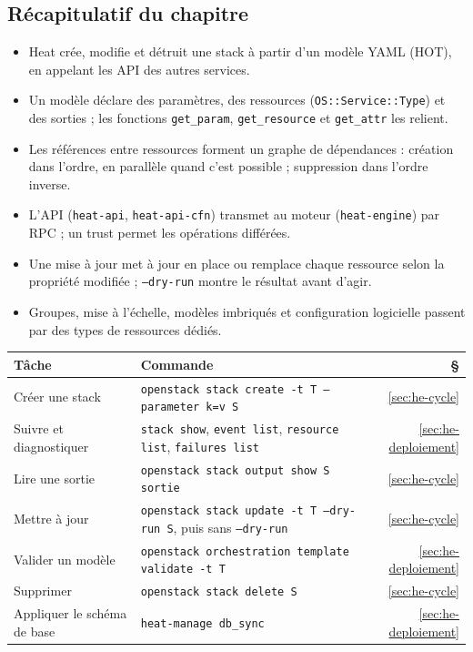\subsection{Récapitulatif du chapitre}\label{sec:he-recap}

\begin{aretenir}
\begin{itemize}
  \item Heat crée, modifie et détruit une \gls{stack} à partir d'un modèle YAML (HOT), en appelant les API des autres services.
  \item Un modèle déclare des paramètres, des ressources (\texttt{OS::Service::Type}) et des sorties ; les fonctions
        \texttt{get\_param}, \texttt{get\_resource} et \texttt{get\_attr} les relient.
  \item Les références entre ressources forment un graphe de dépendances : création dans l'ordre, en parallèle quand c'est
        possible ; suppression dans l'ordre inverse.
  \item L'API (\texttt{heat-api}, \texttt{heat-api-cfn}) transmet au moteur (\texttt{heat-engine}) par RPC ; un trust permet
        les opérations différées.
  \item Une mise à jour met à jour en place ou remplace chaque ressource selon la propriété modifiée ; \texttt{--dry-run}
        montre le résultat avant d'agir.
  \item Groupes, mise à l'échelle, modèles imbriqués et configuration logicielle passent par des types de ressources dédiés.
\end{itemize}
\end{aretenir}

\begin{center}
\renewcommand{\arraystretch}{1.35}
\begin{tabular}{@{}>{\raggedright\arraybackslash}p{4.2cm}>{\raggedright\arraybackslash}p{9.9cm}r@{}}
\toprule
\textbf{Tâche} & \textbf{Commande} & \textbf{§} \\
\midrule
Créer une stack & \texttt{openstack stack create -t T --parameter k=v S} & \ref{sec:he-cycle} \\
Suivre et diagnostiquer & \texttt{stack show}, \texttt{event list}, \texttt{resource list}, \texttt{failures list} & \ref{sec:he-deploiement} \\
Lire une sortie & \texttt{openstack stack output show S sortie} & \ref{sec:he-cycle} \\
Mettre à jour & \texttt{openstack stack update -t T --dry-run S}, puis sans \texttt{--dry-run} & \ref{sec:he-cycle} \\
Valider un modèle & \texttt{openstack orchestration template validate -t T} & \ref{sec:he-deploiement} \\
Supprimer & \texttt{openstack stack delete S} & \ref{sec:he-cycle} \\
Appliquer le schéma de base & \texttt{heat-manage db\_sync} & \ref{sec:he-deploiement} \\
\bottomrule
\end{tabular}
\end{center}

